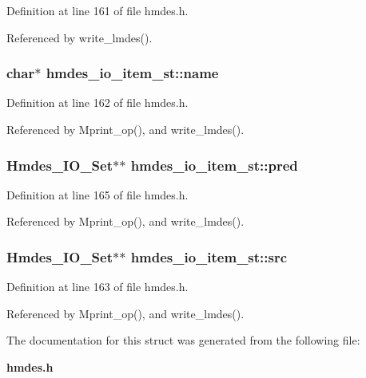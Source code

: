Definition at line 161 of file hmdes.h.

Referenced by write\_\-lmdes().
\subsubsection{\setlength{\rightskip}{0pt plus 5cm}char$\ast$ \bf{hmdes\_\-io\_\-item\_\-st::name}}\label{structhmdes__io__item__st_8607878410c73a0b45ee724f1eaebbbc}




Definition at line 162 of file hmdes.h.

Referenced by Mprint\_\-op(), and write\_\-lmdes().
\subsubsection{\setlength{\rightskip}{0pt plus 5cm}\bf{Hmdes\_\-IO\_\-Set}$\ast$$\ast$ \bf{hmdes\_\-io\_\-item\_\-st::pred}}\label{structhmdes__io__item__st_eeb833889fdf62378bef2f4f0e6d700a}




Definition at line 165 of file hmdes.h.

Referenced by Mprint\_\-op(), and write\_\-lmdes().
\subsubsection{\setlength{\rightskip}{0pt plus 5cm}\bf{Hmdes\_\-IO\_\-Set}$\ast$$\ast$ \bf{hmdes\_\-io\_\-item\_\-st::src}}\label{structhmdes__io__item__st_6c773db376d5ad314a5647ffae81239a}




Definition at line 163 of file hmdes.h.

Referenced by Mprint\_\-op(), and write\_\-lmdes().

The documentation for this struct was generated from the following file:\begin{CompactItemize}
\item 
\bf{hmdes.h}\end{CompactItemize}

